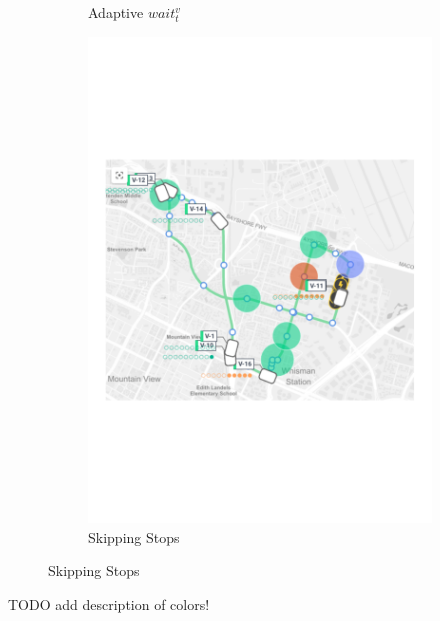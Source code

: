 \documentclass[12pt,a4paper]{article}
\begin{document}
\begin{figure}
{\begin{subfigure}[b]{0.4\textwidth}
  \caption{Adaptive $wait_t^{v}$}
  \label{adaptive}
\end{subfigure}
\begin{subfigure}[b]{0.4\textwidth}
  \includegraphics[width=\linewidth]{./images/optionalstopsgroup.pdf}
  \caption{Skipping Stops}
  \label{skip}
\end{subfigure}
}
\label{simustate}
\end{figure}
TODO add description of colors!
\end{document}
